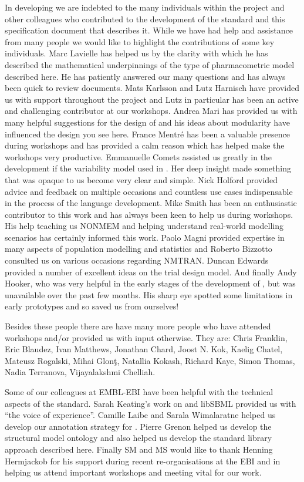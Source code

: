 In developing \pharmml we are indebted to the many individuals within
the \ddmore project and other colleagues who contributed to the
development of the standard and this specification document that
describes it. While we have had help and assistance from many people
we would like to highlight the contributions of some key
individuals. Marc Lavielle has helped us by the clarity with which he
has described the mathematical underpinnings of the type of
pharmacometric model described here. He has patiently answered our
many questions and has always been quick to review documents. Mats
Karlsson and Lutz Harnisch have provided us with support throughout
the project and Lutz in particular has been an active and challenging
contributor at our workshops. Andrea Mari has provided us with many
helpful suggestions for the design of \pharmml and his ideas about
modularity have influenced the design you see here. France Mentr\'{e}
has been a valuable presence during workshops and has provided a calm
reason which has helped make the \pharmml workshops very
productive. Emmanuelle Comets assisted us greatly in the development
if the variability model used in \pharmml. Her deep insight made
something that was opaque to us become very clear and simple. Nick
Holford provided advice and feedback on multiple occasions and
countless use cases indispensable in the process of the language
development.  Mike Smith has been an enthusiastic contributor to this
work and has always been keen to help us during workshops. His help
teaching us NONMEM and helping understand real-world modelling
scenarios has certainly informed this work. Paolo Magni provided
expertise in many aspects of population modelling and statistics and
Roberto Bizzotto consulted us on various occasions regarding NMTRAN\@.
Duncan Edwards provided a number of excellent ideas on the trial design model.
And finally Andy Hooker, who was very helpful in the early stages of
the development of \pharmml, but was unavailable over the past few
months. His sharp eye spotted some limitations in early prototypes and
so saved us from ourselves!

Besides these people there
are have many more people who have attended workshops and/or provided us
with input otherwise. They are: 
Chris Franklin,
Eric Blaudez,
Ivan Matthews, 
Jonathan Chard,
Joost N. Kok,
Kaelig Chatel, 
Mateusz Rogalski,
Mihai Glon\c{t}, 
Natallia Kokash,
Richard Kaye, 
Simon Thomas, 
Nadia Terranova,
Vijayalakshmi Chelliah.

Some of our colleagues at EMBL-EBI have been helpful with the
technical aspects of the standard. Sarah Keating's work on \sbml and
libSBML provided us with ``the voice of experience''. Camille Laibe and
Sarala Wimalaratne helped us develop our annotation strategy for
\pharmml. Pierre Grenon helped us
develop the structural model ontology and also helped us develop the
standard library approach described here. Finally SM and MS would like
to thank Henning Hermjackob for his support during recent
re-organisations at the EBI and in helping us attend important
workshops and meeting vital for our work.

